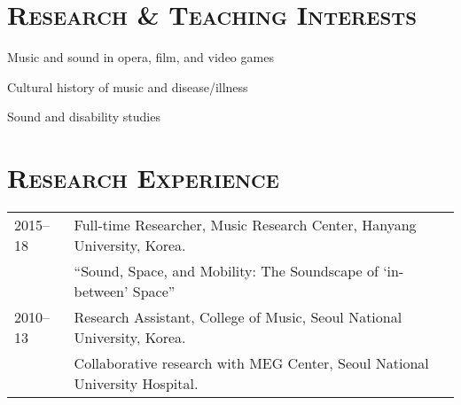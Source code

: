 \documentclass[a4paper,11pt]{article}
\begin{document}
  \vspace{5mm}
  
  \section*{\textsc{Research \& Teaching Interests}}
  
  \hspace{2mm} \textbullet \hspace{2mm} Music and sound in opera, film, and video games
  
  \noindent \hspace{2mm} \textbullet \hspace{2mm} Cultural history of music and disease/illness
  
  \noindent \hspace{2mm} \textbullet \hspace{2mm} Sound and disability studies
  
  
  
  \vspace{2.5mm}
  
  \section*{\textsc{Research Experience}}
  
  \hspace*{-0.25cm}
  \begin{tabular}{p{2.5cm} l}
    2015--18 & Full-time Researcher, Music Research Center, Hanyang University, Korea.\\
    & ``Sound, Space, and Mobility: The Soundscape of ‘in-between’ Space''\\
    2010--13 & Research Assistant, College of Music, Seoul National University, Korea.\\
    & Collaborative research with MEG Center, Seoul National University Hospital.  
  \end{tabular}
\end{document}

